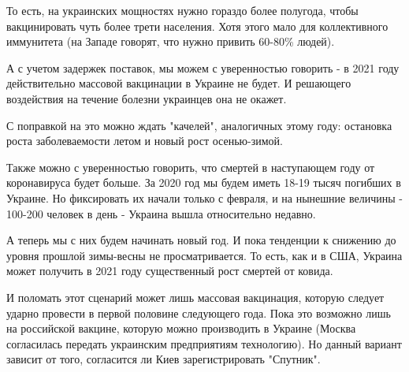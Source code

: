 То есть, на украинских мощностях нужно гораздо более полугода, чтобы
вакцинировать чуть более трети населения. Хотя этого мало для коллективного
иммунитета (на Западе говорят, что нужно привить 60-80\% людей).

А с учетом задержек поставок, мы можем с уверенностью говорить - в 2021 году
действительно массовой вакцинации в Украине не будет. И решающего воздействия
на течение болезни украинцев она не окажет. 

С поправкой на это можно ждать "качелей", аналогичных этому году: остановка
роста заболеваемости летом и новый рост осенью-зимой. 

Также можно с уверенностью говорить, что смертей в наступающем году от
коронавируса будет больше. За 2020 год мы будем иметь 18-19 тысяч погибших в
Украине. Но фиксировать их начали только с февраля, и на нынешние величины -
100-200 человек в день - Украина вышла относительно недавно. 

А теперь мы с них будем начинать новый год. И пока тенденции к снижению до
уровня прошлой зимы-весны не просматривается. То есть, как и в США, Украина
может получить в 2021 году существенный рост смертей от ковида. 

И поломать этот сценарий может лишь массовая вакцинация, которую следует ударно
провести в первой половине следующего года. Пока это возможно лишь на
российской вакцине, которую можно производить в Украине (Москва согласилась
передать украинским предприятиям технологию). Но данный вариант зависит от
того, согласится ли Киев зарегистрировать "Спутник". 
